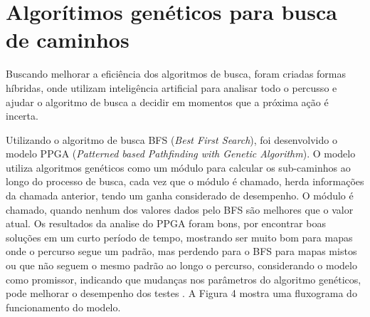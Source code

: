 \section{Algorítimos genéticos para busca de caminhos}

Buscando melhorar a eficiência dos algoritmos de busca, foram criadas formas híbridas, onde utilizam inteligência artificial para analisar todo o percusso e ajudar o algoritmo de busca a decidir em momentos que a próxima ação é incerta.

Utilizando o algoritmo de busca BFS (\textit{Best First Search}), foi desenvolvido o modelo PPGA (\textit{Patterned based Pathfinding with Genetic Algorithm}). O modelo utiliza algoritmos genéticos como um módulo para calcular os sub-caminhos ao longo do processo de busca, cada vez que o módulo é chamado, herda informações da chamada anterior, tendo um ganha considerado de desempenho. O módulo é chamado, quando nenhum dos valores dados pelo BFS são melhores que o valor atual. Os resultados da analise do PPGA foram bons, por encontrar boas soluções em um curto período de tempo, mostrando ser muito bom para mapas onde o percurso segue um padrão, mas perdendo para o BFS para mapas mistos ou que não seguem o mesmo padrão ao longo o percurso, considerando o modelo como promissor, indicando que mudanças nos parâmetros do algoritmo genéticos, pode melhorar o desempenho dos testes \cite{Ulysses}. A Figura 4 mostra uma fluxograma do funcionamento do modelo.

\begin{minipage}{\linewidth}
\end{minipage}

